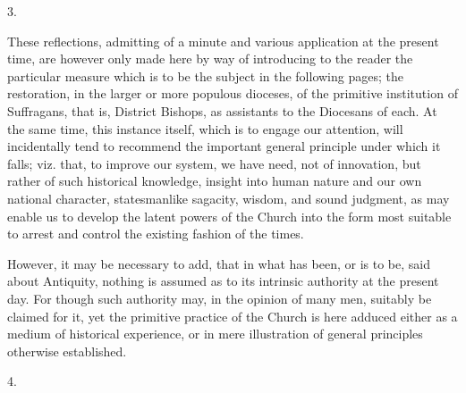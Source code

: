 3.

These reflections, admitting of a minute and
various application at the present time, are however only made here by
way of introducing to the reader the particular measure which is to be
the subject in the following pages; the restoration, in the larger or
more populous dioceses, of the primitive institution of Suffragans,
that is, District Bishops, as assistants to the Diocesans of each. At
the same time, this instance itself, which is to engage our attention,
will incidentally tend to recommend the important general principle
under which it falls; viz. that, to improve our system, we have need,
not of innovation, but rather of such historical knowledge, insight
into human nature and our own national character, statesmanlike
sagacity, wisdom, and sound judgment, as may enable us to develop the
latent powers of the Church into the form most suitable to arrest and
control the existing fashion of the times.

However, it may be necessary to add, that in what
has been, or is to be, said about Antiquity, nothing is assumed as to
its intrinsic authority at the present day. For though such authority
may, in the opinion of many men, suitably be claimed for it, yet the
primitive practice of the Church is here adduced either as a medium of
historical experience, or in mere illustration of general principles
otherwise established.

4.

